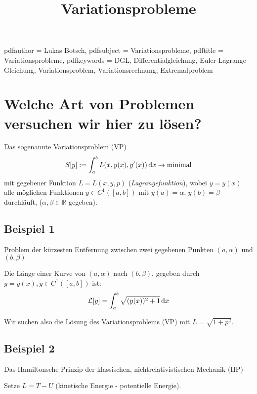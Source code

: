 %

\title{Variationsprobleme}
\hypersetup
{
    pdfauthor = {Lukas Botsch},
    pdfsubject = {Variationsprobleme},
    pdftitle = {Variationsprobleme},
    pdfkeywords = {DGL, Differentialgleichung, Euler-Lagrange Gleichung, Variationsproblem, Variationsrechnung, Extremalproblem}
}



\maketitle{}

\section{Welche Art von Problemen versuchen wir hier zu lösen?}
Das sogenannte Variationsproblem (VP)
\begin{equation}
    S[y] := \int_{a}^{b} L(x, y(x), y'(x)) \, \mathrm{d}x \rightarrow \mathrm{ minimal} \label{eq:vp}
\end{equation}
mit gegebener Funktion $L = L(x, y, p)$ (\textit{Lagrangefunktion}), wobei $y=y(x)$ alle möglichen
Funktionen $y \in C^{1}([a,b])$ mit $y(a) = \alpha$, $y(b) = \beta$ durchläuft,
($\alpha, \beta \in \mathbb{R}$ gegeben).

\subsection*{Beispiel 1}
Problem der kürzesten Entfernung zwischen zwei gegebenen Punkten $(a, \alpha)$ und $(b, \beta)$


Die Länge einer Kurve von $(a, \alpha)$ nach $(b, \beta)$, gegeben durch $y=y(x), y \in C^1([a,b])$ ist:
\begin{equation}
    \mathcal{L}[y] = \int_{a}^{b} \sqrt{(y(x))^2 + 1} \, \mathrm{d}x
\end{equation}

Wir suchen also die Lösung des Variationsproblems (VP) mit $L = \sqrt{1 + p^{2}}$.

\subsection*{Beispiel 2}
Das Hamiltonsche Prinzip der klassischen, nichtrelativistischen Mechanik (HP)

Setze $L = T - U$ (kinetische Energie - potentielle Energie).


